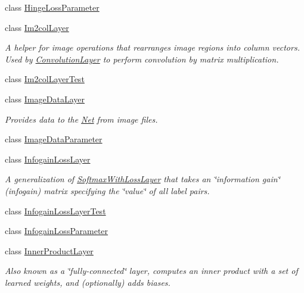 \begin{DoxyCompactItemize}
\item 
class \mbox{\hyperlink{classcaffe_1_1_hinge_loss_parameter}{Hinge\+Loss\+Parameter}}
\item 
class \mbox{\hyperlink{classcaffe_1_1_im2col_layer}{Im2col\+Layer}}
\begin{DoxyCompactList}\small\item\em A helper for image operations that rearranges image regions into column vectors. Used by \mbox{\hyperlink{classcaffe_1_1_convolution_layer}{Convolution\+Layer}} to perform convolution by matrix multiplication. \end{DoxyCompactList}\item 
class \mbox{\hyperlink{classcaffe_1_1_im2col_layer_test}{Im2col\+Layer\+Test}}
\item 
class \mbox{\hyperlink{classcaffe_1_1_image_data_layer}{Image\+Data\+Layer}}
\begin{DoxyCompactList}\small\item\em Provides data to the \mbox{\hyperlink{classcaffe_1_1_net}{Net}} from image files. \end{DoxyCompactList}\item 
class \mbox{\hyperlink{classcaffe_1_1_image_data_parameter}{Image\+Data\+Parameter}}
\item 
class \mbox{\hyperlink{classcaffe_1_1_infogain_loss_layer}{Infogain\+Loss\+Layer}}
\begin{DoxyCompactList}\small\item\em A generalization of \mbox{\hyperlink{classcaffe_1_1_softmax_with_loss_layer}{Softmax\+With\+Loss\+Layer}} that takes an \char`\"{}information gain\char`\"{} (infogain) matrix specifying the \char`\"{}value\char`\"{} of all label pairs. \end{DoxyCompactList}\item 
class \mbox{\hyperlink{classcaffe_1_1_infogain_loss_layer_test}{Infogain\+Loss\+Layer\+Test}}
\item 
class \mbox{\hyperlink{classcaffe_1_1_infogain_loss_parameter}{Infogain\+Loss\+Parameter}}
\item 
class \mbox{\hyperlink{classcaffe_1_1_inner_product_layer}{Inner\+Product\+Layer}}
\begin{DoxyCompactList}\small\item\em Also known as a \char`\"{}fully-\/connected\char`\"{} layer, computes an inner product with a set of learned weights, and (optionally) adds biases. \end{DoxyCompactList}\item 

\end{DoxyCompactItemize}
